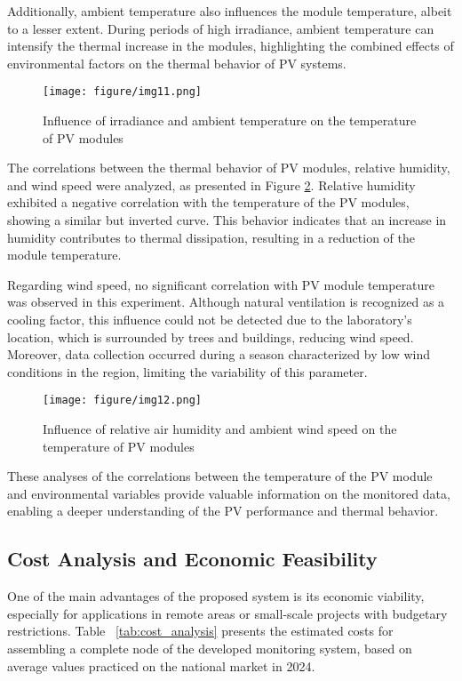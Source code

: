 Additionally, ambient temperature also influences the module temperature, albeit to a lesser extent. During periods of high irradiance, ambient temperature can intensify the thermal increase in the modules, highlighting the combined effects of environmental factors on the thermal behavior of PV systems.



\begin{figure}[h]
    \centering
    \texttt{[image: figure/img11.png]}
    \caption{Influence of irradiance and ambient temperature on the temperature of PV modules}
    \label{fig:temp_irradiancia}
\end{figure}


The correlations between the thermal behavior of PV modules, relative humidity, and wind speed were analyzed, as presented in Figure \ref{fig:umidade_vento}. Relative humidity exhibited a negative correlation with the temperature of the PV modules, showing a similar but inverted curve. This behavior indicates that an increase in humidity contributes to thermal dissipation, resulting in a reduction of the module temperature.

Regarding wind speed, no significant correlation with PV module temperature was observed in this experiment. Although natural ventilation is recognized as a cooling factor, this influence could not be detected due to the laboratory's location, which is surrounded by trees and buildings, reducing wind speed. Moreover, data collection occurred during a season characterized by low wind conditions in the region, limiting the variability of this parameter.


\begin{figure}[h]
    \centering
    \texttt{[image: figure/img12.png]}
    \caption{Influence of relative air humidity and ambient wind speed on the temperature of PV modules}
    \label{fig:umidade_vento}
\end{figure}


These analyses of the correlations between the temperature of the PV module and environmental variables provide valuable information on the monitored data, enabling a deeper understanding of the PV performance and thermal behavior.

\subsection{Cost Analysis and Economic Feasibility}

One of the main advantages of the proposed system is its economic viability, especially for applications in remote areas or small-scale projects with budgetary restrictions. Table ~\ref{tab:cost_analysis} presents the estimated costs for assembling a complete node of the developed monitoring system, based on average values practiced on the national market in 2024.

